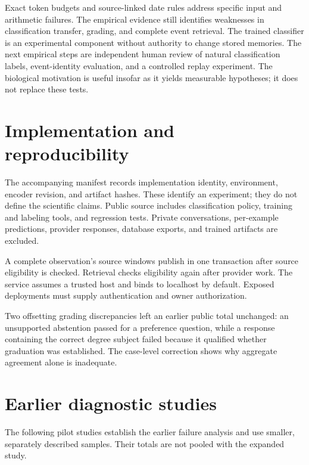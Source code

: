 \documentclass[11pt]{article}
\begin{document}
Exact token budgets and source-linked date rules address specific input and arithmetic failures. The empirical evidence still identifies weaknesses in classification transfer, grading, and complete event retrieval. The trained classifier is an experimental component without authority to change stored memories. The next empirical steps are independent human review of natural classification labels, event-identity evaluation, and a controlled replay experiment. The biological motivation is useful insofar as it yields measurable hypotheses; it does not replace these tests.

\appendix
\section{Implementation and reproducibility}
The accompanying manifest records implementation identity, environment, encoder revision, and artifact hashes. These identify an experiment; they do not define the scientific claims. Public source includes classification policy, training and labeling tools, and regression tests. Private conversations, per-example predictions, provider responses, database exports, and trained artifacts are excluded.

A complete observation's source windows publish in one transaction after source eligibility is checked. Retrieval checks eligibility again after provider work. The service assumes a trusted host and binds to localhost by default. Exposed deployments must supply authentication and owner authorization.

Two offsetting grading discrepancies left an earlier public total unchanged: an unsupported abstention passed for a preference question, while a response containing the correct degree subject failed because it qualified whether graduation was established. The case-level correction shows why aggregate agreement alone is inadequate.

\section{Earlier diagnostic studies}
The following pilot studies establish the earlier failure analysis and use smaller, separately described samples. Their totals are not pooled with the expanded study.



\clearpage

\begingroup
\small
\setlength{\bibsep}{2pt}

\endgroup
\end{document}
